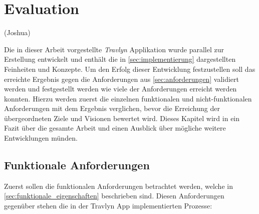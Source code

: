 \chapter{Evaluation}

(Joshua)

Die in dieser Arbeit vorgestellte \textit{Travlyn} Applikation wurde parallel zur Erstellung entwickelt und enthält die in \autoref{sec:implementierung} dargestellten Feinheiten und Konzepte. Um den Erfolg dieser Entwicklung festzustellen soll das erreichte Ergebnis gegen die Anforderungen aus \autoref{sec:anforderungen} validiert werden und festgestellt werden wie viele der Anforderungen erreicht werden konnten. Hierzu werden zuerst die einzelnen funktionalen und nicht-funktionalen Anforderungen mit dem Ergebnis verglichen, bevor die Erreichung der übergeordneten Ziele und Visionen bewertet wird. Dieses Kapitel wird in ein Fazit über die gesamte Arbeit und einen Ausblick über mögliche weitere Entwicklungen münden.

\section{Funktionale Anforderungen}\label{sec:funktional_evaluation}
Zuerst sollen die funktionalen Anforderungen betrachtet werden, welche in \autoref{sec:funktionale_eigenschaften} beschrieben sind. Diesen Anforderungen gegenüber stehen die in der Travlyn App implementierten Prozesse:


